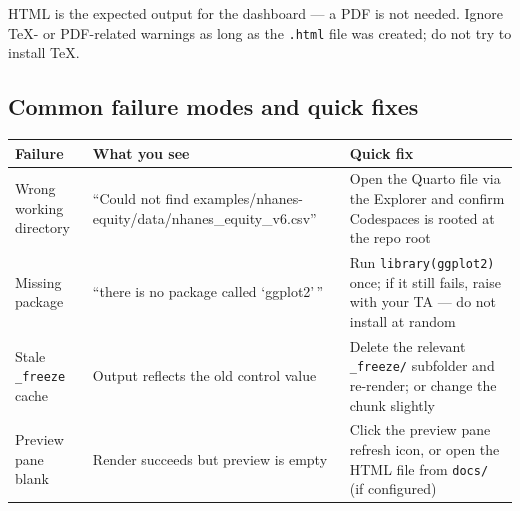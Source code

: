 \documentclass[
  letterpaper,
  DIV=11,
  numbers=noendperiod,
  oneside]{scrreprt}
\begin{document}
HTML is the expected output for the dashboard --- a PDF is not needed.
Ignore TeX- or PDF-related warnings as long as the \texttt{.html} file
was created; do not try to install TeX.

\subsection*{Common failure modes and quick
fixes}\label{common-failure-modes-and-quick-fixes}

\begin{longtable}[]{@{}
  >{\raggedright\arraybackslash}p{}
  >{\raggedright\arraybackslash}p{}
  >{\raggedright\arraybackslash}p{}@{}}
\toprule\noalign{}
\begin{minipage}[b]{\linewidth}\raggedright
Failure
\end{minipage} & \begin{minipage}[b]{\linewidth}\raggedright
What you see
\end{minipage} & \begin{minipage}[b]{\linewidth}\raggedright
Quick fix
\end{minipage} \\
\midrule\noalign{}
\endhead
\bottomrule\noalign{}
\endlastfoot
Wrong working directory & ``Could not find
examples/nhanes-equity/data/nhanes\_equity\_v6.csv'' & Open the Quarto
file via the Explorer and confirm Codespaces is rooted at the repo
root \\
Missing package & ``there is no package called `ggplot2'\,'' & Run
\texttt{library(ggplot2)} once; if it still fails, raise with your TA
--- do not install at random \\
Stale \texttt{\_freeze} cache & Output reflects the old control value &
Delete the relevant \texttt{\_freeze/} subfolder and re-render; or
change the chunk slightly \\
Preview pane blank & Render succeeds but preview is empty & Click the
preview pane refresh icon, or open the HTML file from \texttt{docs/} (if
configured) \\
\end{longtable}
\end{document}
